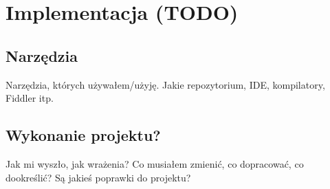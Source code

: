 \chapter{Implementacja (TODO)}

\section{Narzędzia}
Narzędzia, których używałem/użyję. Jakie repozytorium, IDE, kompilatory, Fiddler itp.

\section{Wykonanie projektu?}
Jak mi wyszło, jak wrażenia? Co musiałem zmienić, co dopracować, co dookreślić? Są jakieś poprawki do projektu?